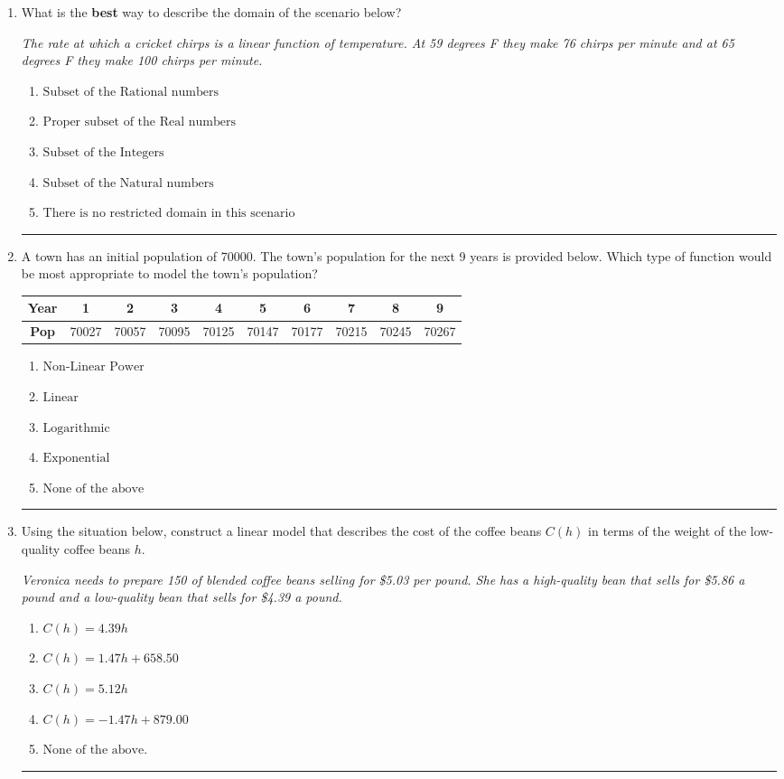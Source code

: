 \documentclass[14pt]{extbook}
\newcommand{\litem}[1]{\item#1\hspace*{-1cm}\rule{\textwidth}{0.4pt}}
\begin{document}
\begin{enumerate}
{\begin{enumerate}[label=\Alph*.]
\end{enumerate} }
\litem{
What is the \textbf{best} way to describe the domain of the scenario below?
\begin{center}
    \textit{ The rate at which a cricket chirps is a linear function of temperature. At 59 degrees F they make 76 chirps per minute and at 65 degrees F they make 100 chirps per minute. }
\end{center}
\begin{enumerate}[label=\Alph*.]
\item \( \text{Subset of the Rational numbers} \)
\item \( \text{Proper subset of the Real numbers} \)
\item \( \text{Subset of the Integers} \)
\item \( \text{Subset of the Natural numbers} \)
\item \( \text{There is no restricted domain in this scenario} \)

\end{enumerate} }
\litem{
A town has an initial population of 70000. The town's population for the next 9 years is provided below. Which type of function would be most appropriate to model the town's population?

\begin{tabular}{c|c|c|c|c|c|c|c|c|c}
\textbf{Year} &1 &2 &3 &4 &5 &6 &7 &8 &9\tabularnewline \hline
\textbf{Pop} &70027 &70057 &70095 &70125 &70147 &70177 &70215 &70245 &70267\end{tabular}\begin{enumerate}[label=\Alph*.]
\item \( \text{Non-Linear Power} \)
\item \( \text{Linear} \)
\item \( \text{Logarithmic} \)
\item \( \text{Exponential} \)
\item \( \text{None of the above} \)

\end{enumerate} }
\litem{
Using the situation below, construct a linear model that describes the cost of the coffee beans $C(h)$ in terms of the weight of the low-quality coffee beans $h$.
\begin{center}
    \textit{ Veronica needs to prepare 150 of blended coffee beans selling for \$5.03 per pound. She has a high-quality bean that sells for \$5.86 a pound and a low-quality bean that sells for \$4.39 a pound. }
\end{center}
\begin{enumerate}[label=\Alph*.]
\item \( C(h) = 4.39 h \)
\item \( C(h) = 1.47 h + 658.50 \)
\item \( C(h) = 5.12 h \)
\item \( C(h) = -1.47 h + 879.00 \)
\item \( \text{None of the above.} \)

\end{enumerate} }
\end{enumerate}
\end{document}
